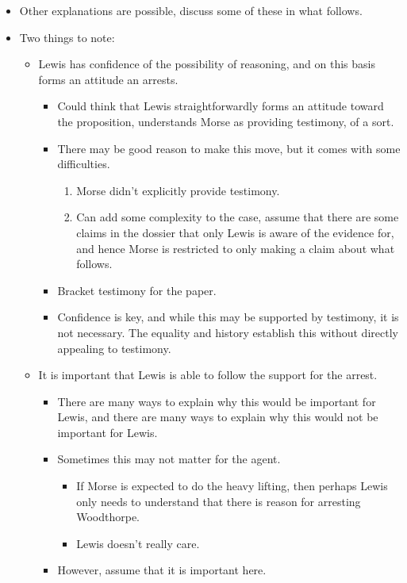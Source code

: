 \documentclass[10pt]{article}
\begin{document}
\begin{itemize}
\item Other explanations are possible, discuss some of these in what follows.
\item Two things to note:
  \begin{itemize}
  \item Lewis has confidence of the possibility of reasoning, and on this basis forms an attitude an arrests.
    \begin{itemize}
    \item Could think that Lewis straightforwardly forms an attitude toward the proposition, understands Morse as providing testimony, of a sort.
    \item There may be good reason to make this move, but it comes with some difficulties.
      \begin{enumerate}
      \item Morse didn't explicitly provide testimony.
      \item Can add some complexity to the case, assume that there are some claims in the dossier that only Lewis is aware of the evidence for, and hence Morse is restricted to only making a claim about what follows.
      \end{enumerate}
    \item Bracket testimony for the paper.
    \item Confidence is key, and while this may be supported by testimony, it is not necessary.
      The equality and history establish this without directly appealing to testimony.
    \end{itemize}
  \item It is important that Lewis is able to follow the support for the arrest.
    \begin{itemize}
    \item There are many ways to explain why this would be important for Lewis, and there are many ways to explain why this would not be important for Lewis.
    \item Sometimes this may not matter for the agent.
      \begin{itemize}
      \item If Morse is expected to do the heavy lifting, then perhaps Lewis only needs to understand that there is reason for arresting Woodthorpe.
      \item Lewis doesn't really care.
      \end{itemize}
    \item However, assume that it is important here.

\end{itemize}
\end{itemize}
\end{itemize}
\end{document}
